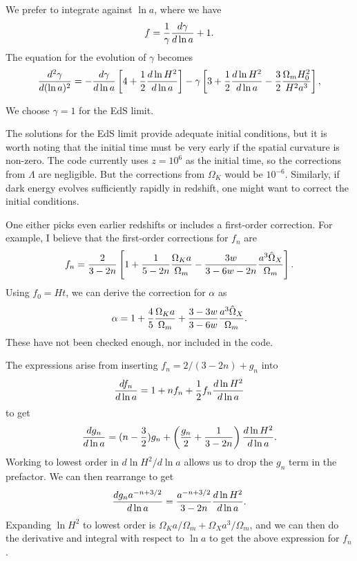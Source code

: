 \documentclass[11pt,preprint]{aastex}
\begin{document}
We prefer to integrate against $\ln a$, where we have 
\begin{equation}
f = {1\over \gamma}{d\gamma\over d\ln a} +1.
\end{equation}
The equation for the evolution of $\gamma$ becomes
\begin{equation}
{d^2\gamma\over d(\ln a)^2} = 
-{d\gamma\over d\ln a}\left[ 4 + {1\over 2}{d\ln H^2\over d\ln a}\right]
- \gamma \left[ 3 + {1\over2}{d\ln H^2\over d\ln a} - {3\over 2} {\Omega_m H_0^2 \over H^2 a^3}
\right],
\end{equation}

We choose $\gamma=1$ for the EdS limit.

\bigskip

The solutions for the EdS limit provide adequate initial conditions, but it 
is worth noting that the initial time must be very early if the spatial curvature
is non-zero.  The code currently uses $z=10^6$ as the initial time, so the 
corrections from $\Lambda$ are negligible.  But the corrections from $\Omega_K$
would be $10^{-6}$.  Similarly, if dark energy evolves sufficiently rapidly in
redshift, one might want to correct the initial conditions.

One either picks even earlier redshifts or includes a first-order correction.
For example, I believe that the first-order corrections for $f_n$ are 
\begin{equation}
f_n = {2\over 3-2n}\left[ 1 + {1\over 5-2n}{\Omega_K a\over \Omega_m}
- {3w\over 3-6w-2n} {a^3\hat\Omega_X\over \Omega_m} \right].
\end{equation}
Using $f_0 = Ht$, we can derive the correction for $\alpha$ as
\begin{equation}
\alpha = 1 + {4\over 5}{\Omega_K a\over \Omega_m}
+ {3-3w\over 3-6w} {a^3\hat\Omega_X\over \Omega_m}.
\end{equation}
These have not been checked enough, nor included in the code.

The expressions arise from inserting $f_n = 2/(3-2n) + g_n$ into
\begin{equation}
{df_n\over d\ln a} = 1+nf_n + {1\over 2}f_n {d\ln H^2\over d\ln a}
\end{equation}
to get 
\begin{equation}
{dg_n\over d\ln a} = (n-{3\over2})g_n + \left({g_n\over 2}+{1\over 3-2n}\right)
{d\ln H^2\over d\ln a}.
\end{equation}
Working to lowest order in $d\ln H^2/d\ln a$ allows us to drop the $g_n$
term in the prefactor.  We can then rearrange to get
\begin{equation}
{dg_n a^{-n+3/2}\over d\ln a} = {a^{-n+3/2}\over 3-2n} {d\ln H^2\over d\ln a}.
\end{equation}
Expanding $\ln H^2$ to lowest order is $\Omega_Ka/\Omega_m+\hat\Omega_X a^3/\Omega_m$,
and we can then do the derivative and integral with respect to $\ln a$ to
get the above expression for $f_n$. 
\end{document}
